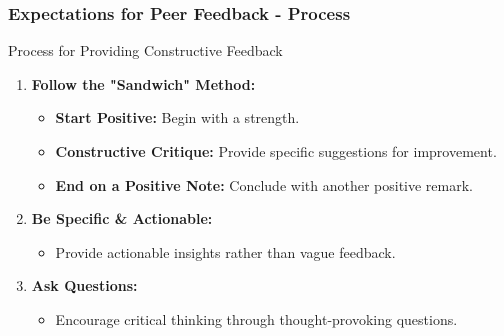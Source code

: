 \documentclass{beamer}
\begin{document}
\begin{frame}[fragile]
    \frametitle{Expectations for Peer Feedback - Process}
    \begin{block}{Process for Providing Constructive Feedback}
        \begin{enumerate}
            \item \textbf{Follow the "Sandwich" Method:}
            \begin{itemize}
                \item \textbf{Start Positive:} Begin with a strength.
                \item \textbf{Constructive Critique:} Provide specific suggestions for improvement.
                \item \textbf{End on a Positive Note:} Conclude with another positive remark.
            \end{itemize}
            \item \textbf{Be Specific \& Actionable:}
            \begin{itemize}
                \item Provide actionable insights rather than vague feedback.
            \end{itemize}
            \item \textbf{Ask Questions:}
            \begin{itemize}
                \item Encourage critical thinking through thought-provoking questions.
            \end{itemize}
        \end{enumerate}
    \end{block}
\end{frame}
\end{document}
